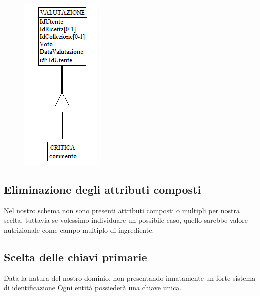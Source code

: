 ﻿\documentclass[a4paper,12pt]{report}
\begin{document}
\begin{figure}[h!]
    \centering
    \includegraphics[width=0.3\linewidth]{app_images/gerarchia_valutazione.png}
\end{figure}
\subsection{Eliminazione degli attributi composti}
Nel nostro schema non sono presenti attributi composti o multipli per nostra scelta,
tuttavia se volessimo individuare un possibile caso, quello sarebbe valore nutrizionale
come campo multiplo di ingrediente.
\subsection{Scelta delle chiavi primarie}
Data la natura del nostro dominio, non presentando innatamente un forte sistema di identificazione
Ogni entità possiederà una chiave unica.
\end{document}
